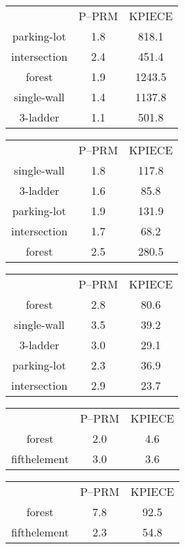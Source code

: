 \documentclass{article}
\begin{document}
\begin{tabular}{c c c}
&P--PRM&KPIECE\\
parking-lot&1.8&818.1\\
intersection&2.4&451.4\\
forest&1.9&1243.5\\
single-wall&1.4&1137.8\\
3-ladder&1.1&501.8\\
\end{tabular}
\begin{tabular}{c c c}
&P--PRM&KPIECE\\
single-wall&1.8&117.8\\
3-ladder&1.6&85.8\\
parking-lot&1.9&131.9\\
intersection&1.7&68.2\\
forest&2.5&280.5\\
\end{tabular}
\begin{tabular}{c c c}
&P--PRM&KPIECE\\
forest&2.8&80.6\\
single-wall&3.5&39.2\\
3-ladder&3.0&29.1\\
parking-lot&2.3&36.9\\
intersection&2.9&23.7\\
\end{tabular}
\begin{tabular}{c c c}
&P--PRM&KPIECE\\
forest&2.0&4.6\\
fifthelement&3.0&3.6\\
\end{tabular}
\begin{tabular}{c c c}
&P--PRM&KPIECE\\
forest&7.8&92.5\\
fifthelement&2.3&54.8\\
\end{tabular}
\end{document}

